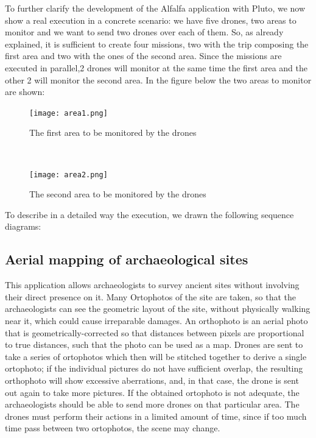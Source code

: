 To further clarify the development of the Alfalfa\cite{alfalfa} application with Pluto, we now show a real execution in a concrete scenario:
we have five drones, two areas to monitor and we want to send two drones over each of them.
So, as already explained, it is sufficient to create four missions, two with the trip composing the first area and two with the ones of the second area.
Since the missions are executed in parallel,2 drones will monitor at the same time the first area and the other 2 will monitor  the second area.
In the figure below the two areas to monitor are shown:

\begin{figure}[H]
 \begin{minipage}[b]{7cm}
   \centering
   \texttt{[image: area1.png]}
   \caption{The first area to be monitored by the drones}
 \end{minipage}
 \ \hspace{2mm} \hspace{3mm} \
 \begin{minipage}[b]{7cm}
  \centering
   \texttt{[image: area2.png]}
   \caption{The second area to be monitored by the drones}
 \end{minipage}
\end{figure}

To describe in a detailed way the execution, we drawn the following sequence diagrams:



\subsection{Aerial mapping of archaeological sites}\label{aerialMapping}

This application allows archaeologists to survey ancient sites without involving their direct presence on it.
Many Ortophotos of the site are taken, so that the archaeologists can see the geometric layout of the site, without physically walking near it, which could cause irreparable damages.
An orthophoto is an aerial photo that is geometrically-corrected so that distances between pixels are proportional to true distances, such that the photo can be used as a map.
Drones are sent to take a series of ortophotos which then will be stitched together to derive a single ortophoto; if the individual pictures do not have sufficient overlap, the resulting orthophoto will show excessive aberrations, and, in that case, the drone is sent out again to take more pictures.
If the obtained ortophoto is not adequate, the archaeologists should be able to send more drones on that particular area.
The drones must perform their actions in a limited amount of time, since if too much time pass between two ortophotos, the scene may change.

